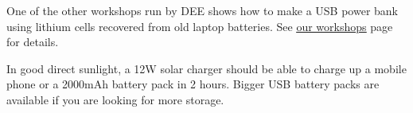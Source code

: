 \documentclass{article}
\theoremstyle{definition}
\theoremstyle{definition}
\theoremstyle{remark}
\begin{document}
    One of the other workshops run by DEE shows how to make a USB power bank using lithium cells recovered from old laptop batteries. See \href{https://www.demandenergyequality.org/our-workshops}{\underline{our workshops}} page for details.

    In good direct sunlight, a 12W solar charger should be able to charge up a mobile phone or a 2000mAh battery pack in 2 hours. Bigger USB battery packs are available if you are looking for more storage.


\end{document}
